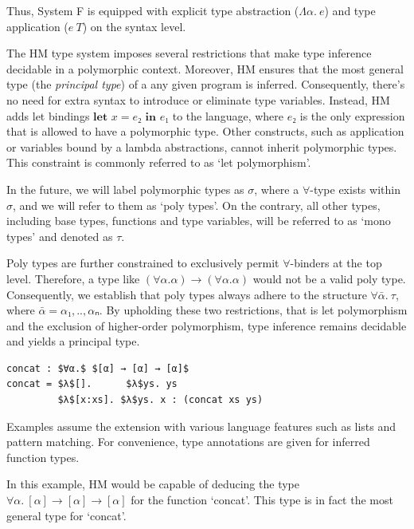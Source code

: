 \documentclass[runningheads]{llncs}
\newcommand{\kwlet}{\textbf{let }}
\newcommand{\kwin}{\textbf{ in }}
\begin{document}
Thus, System F is equipped with explicit type abstraction ($Λα. \ e$)
and type
application ($e \ T$) on the syntax level.

The HM type system imposes several restrictions that make type
inference decidable in a polymorphic context. Moreover, HM ensures that the
most general type (the \emph{principal type}) of a any given program is
inferred.
Consequently, there's no need for extra syntax to introduce or eliminate type
variables.
Instead, HM adds let bindings $\kwlet x = e₂ \kwin e₁$ to the language, where
$e₂$ is the only expression that is allowed to have a polymorphic type.
Other constructs, such as application or variables bound by a lambda
abstractions, cannot inherit polymorphic types.
This constraint is commonly referred to as `let polymorphism'.

In the future, we will label polymorphic types as $σ$,
where a $∀$-type exists within $σ$, and we will refer to them as `poly types'.
On the contrary, all other types, including base
types, functions and type variables, will be referred to as `mono types' and
denoted as $τ$.

Poly types are further constrained to exclusively permit $∀$-binders at the top
level.
Therefore, a type like $(∀α. α) → (∀α. α)$ would not be a valid poly type.
Consequently, we establish that poly types always adhere to the structure
$∀\bar{α}. \ τ$, where $\bar{α} = α₁,..,αₙ$.
By upholding these two restrictions, that is let polymorphism and the exclusion
of
higher-order polymorphism, type inference remains decidable and
yields a principal type.
\begin{example}
  \begin{lstlisting}
concat : $∀α.$ $[α] → [α] → [α]$
concat = $λ$[].      $λ$ys. ys           
         $λ$[x:xs]. $λ$ys. x : (concat xs ys)   
  \end{lstlisting}
\end{example}
Examples assume the extension with various language features such as
lists and pattern matching.
For convenience, type annotations are given for inferred function types.

In this example, HM would be capable of deducing the type $∀α.\ [α] → [α] →
  [α]$
for the function `concat'.
This type is in fact the most general type for `concat'.
\end{document}
